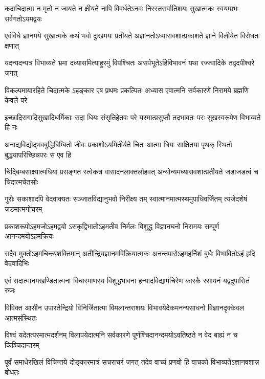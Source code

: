 \fourlineindentedshloka
{कदाचिदात्मा न मृतो न जायते}
{न क्षीयते नापि विवर्धतेऽनवः}
{निरस्तसर्वातिशयः सुखात्मकः}
{स्वयम्प्रभः सर्वगतोऽयमद्वयः} %

\fourlineindentedshloka
{एवंविधे ज्ञानमये सुखात्मके}
{कथं भवो दुःखमयः प्रतीयते}
{अज्ञानतोऽध्यासवशात्प्रकाशते}
{ज्ञाने विलीयेत विरोधतः क्षणात्} %

\fourlineindentedshloka
{यदन्यदन्यत्र विभाव्यते भ्रमा\-}
{दध्यासमित्याहुरमुं विपश्चितः}
{असर्पभूतेऽहिविभावनं यथा}
{रज्ज्वादिके तद्वदपीश्वरे जगत्} %

\fourlineindentedshloka
{विकल्पमायारहिते चिदात्मके\-}
{ऽहङ्कार एष प्रथमः प्रकल्पितः}
{अध्यास एवात्मनि सर्वकारणे}
{निरामये ब्रह्मणि केवले परे} %

\fourlineindentedshloka
{इच्छादिरागादिसुखादिधर्मिकाः}
{सदा धियः संसृतिहेतवः परे}
{यस्मात्प्रसुप्तौ तदभावतः परः}
{सुखस्वरूपेण विभाव्यते हि नः} %

\fourlineindentedshloka
{अनाद्यविद्योद्भवबुद्धिबिम्बितो}
{जीवः प्रकाशोऽयमितीर्यते चितः}
{आत्मा धियः साक्षितया पृथक् स्थितो}
{बुद्ध्यापरिच्छिन्नपरः स एव हि} %

\fourlineindentedshloka
{चिद्बिम्बसाक्ष्यात्मधियां प्रसङ्गत\-}
{स्त्वेकत्र वासादनलाक्तलोहवत्}
{अन्योन्यमध्यासवशात्प्रतीयते}
{जडाजडत्वं च चिदात्मचेतसोः} %

\fourlineindentedshloka
{गुरोः सकाशादपि वेदवाक्यतः}
{सञ्जातविद्यानुभवो निरीक्ष्य तम्}
{स्वात्मानमात्मस्थमुपाधिवर्जितम्}
{त्यजेदशेषं जडमात्मगोचरम्} %

\fourlineindentedshloka
{प्रकाशरूपोऽहमजोऽहमद्वयो\-}
{ऽसकृद्विभातोऽहमतीव निर्मलः}
{विशुद्ध विज्ञानघनो निरामयः}
{सम्पूर्ण आनन्दमयोऽहमक्रियः} %

\fourlineindentedshloka
{सदैव मुक्तोऽहमचिन्त्यशक्तिमान्}
{अतीन्द्रियज्ञानमविक्रियात्मकः}
{अनन्तपारोऽहमहर्निशं बुधैः}
{विभावितोऽहं हृदि वेदवादिभिः} %

\fourlineindentedshloka
{एवं सदात्मानमखण्डितात्मना}
{विचारमाणस्य विशुद्धभावना}
{हन्यादविद्यामचिरेण कारकै}
{रसायनं यद्वदुपासितं रुजः} %

\fourlineindentedshloka
{विविक्त आसीन उपारतेन्द्रियो}
{विनिर्जितात्मा विमलान्तराशयः}
{विभावयेदेकमनन्यसाधनो}
{विज्ञानदृक्केवल आत्मसंस्थितः} %

\fourlineindentedshloka
{विश्वं यदेतत्परमात्मदर्शनम्}
{विलापयेदात्मनि सर्वकारणे}
{पूर्णश्चिदानन्दमयोऽवतिष्ठते}
{न वेद बाह्यं न च किञ्चिदान्तरम्} %

\fourlineindentedshloka
{पूर्वं समाधेरखिलं विचिन्तये\-}
{दोङ्कारमात्रं सचराचरं जगत्}
{तदेव वाच्यं प्रणवो हि वाचको}
{विभाव्यतेऽज्ञानवशान्न बोधतः} %

